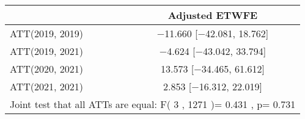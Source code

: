 \documentclass[border=1mm]{standalone}
\begin{document}
\begin{table}
\centering
\begin{tabular}[t]{lc}
\toprule
  & Adjusted ETWFE\\
\midrule
ATT(2019, 2019) & \num{-11.660} [\num{-42.081}, \num{18.762}]\\
ATT(2019, 2021) & \num{-4.624} [\num{-43.042}, \num{33.794}]\\
ATT(2020, 2021) & \num{13.573} [\num{-34.465}, \num{61.612}]\\
ATT(2021, 2021) & \num{2.853} [\num{-16.312}, \num{22.019}]\\
\bottomrule
\multicolumn{2}{l}{\rule{0pt}{1em}Joint test that all ATTs are equal:  F( 3 ,  1271 )=  0.431 , p=  0.731}\\
\end{tabular}
\end{table}
\end{document}
